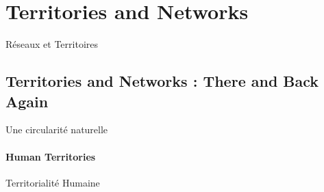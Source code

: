 


\newpage




\section{Territories and Networks}{Réseaux et Territoires}

\label{sec:networkterritories}





\subsection{Territories and Networks : There and Back Again}{Une circularité naturelle}

\paragraph{Human Territories}{Territorialité Humaine}


